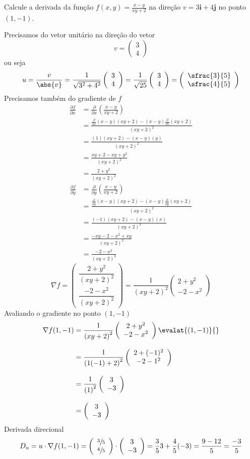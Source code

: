 \documentclass[a4paper,12pt,fleqn]{article}
\newcommand{\D}[2]{\frac{\partial {#1}}{\partial {#2}}}
\newcommand{\vetor}[2]{\left(\begin{array}{c} #1 \\ #2 \end{array}\right)}
\newcommand{\veci}{\bm{i}}
\newcommand{\vecj}{\bm{j}}
\begin{document}
Calcule a derivada da função
\(
  f(x, y) = \frac{x-y}{xy+2}
\)
na direção
\(
  v = 3\veci + 4\vecj
\)
no ponto
\((1, -1)\).

\begin{answer}
  Precisamos do vetor unitário na direção do vetor
  \[
    v = \vetor{3}{4}
  \]
  ou seja
  \[
    u
    = \frac{v}{\abs{v}}
    = \frac{1}{\sqrt{3^2+4^2}}\vetor{3}{4}
    = \frac{1}{\sqrt{25}}\vetor{3}{4}
    = \vetor{\sfrac{3}{5}}{\sfrac{4}{5}}
  \]
  Precisamos também do gradiente de $f$
  \begin{align*}
    \D{f}{x}
    & = \D{}{x}\left(\frac{x-y}{xy+2}\right) \\[3mm]
    & = \frac{\D{}{x}\left(x-y\right)\left(xy+2\right) - \left(x-y\right)\D{}{x}\left(xy+2\right)}
             {\left(xy+2\right)^2} \\[3mm]
    & = \frac{\left(1\right)\left(xy+2\right) - \left(x-y\right)\left(y\right)}
             {\left(xy+2\right)^2} \\[3mm]
    & = \frac{xy+2 - xy + y^2}{\left(xy+2\right)^2} \\[3mm]
    & = \frac{2 + y^2}{\left(xy+2\right)^2}
  \end{align*}
  \begin{align*}
  \D{f}{y}
    & = \D{}{y}\left(\frac{x-y}{xy+2}\right) \\[3mm]
    & = \frac{\D{}{y}\left(x-y\right)\left(xy+2\right) - \left(x-y\right)\D{}{y}\left(xy+2\right)}
    {\left(xy+2\right)^2} \\[3mm]
    & = \frac{\left(-1\right)\left(xy+2\right) - \left(x-y\right)\left(x\right)}
    {\left(xy+2\right)^2} \\[3mm]
    & = \frac{-xy -2 - x^2 + xy}{\left(xy+2\right)^2} \\[3mm]
    & = \frac{-2 - x^2}{\left(xy+2\right)^2}
  \end{align*}
  \[
    \nabla f
    = \left(\begin{array}{r}
      \dfrac{ 2 + y^2}{\left(xy+2\right)^2} \\[5mm]
      \dfrac{-2 - x^2}{\left(xy+2\right)^2}
    \end{array}\right)
    = \frac{1}{\left(xy+2\right)^2}\vetor{ 2 + y^2}{-2 - x^2}
  \]
  Avaliando o gradiente no ponto \((1, -1)\)
  \begin{align*}
    \nabla f(1, -1)
    & = \frac{1}{\left(xy+2\right)^2}\vetor{ 2 + y^2}{-2 - x^2}\evalat{(1, -1)}{} \\[3mm]
    & = \frac{1}{\left(1(-1)+2\right)^2}\vetor{ 2 + (-1)^2}{-2 - 1^2} \\[3mm]
    & = \frac{1}{\left(1\right)^2}\vetor{3}{-3} \\[3mm]
    & = \vetor{3}{-3}
  \end{align*}
  Derivada direcional
  \[
    D_u
    = u \cdot \nabla f(1, -1)
    = \vetor{\sfrac{3}{5}}{\sfrac{4}{5}} \cdot \vetor{3}{-3}
    = \frac{3}{5}3 + \frac{4}{5}(-3)
    = \frac{9-12}{5}
    = \frac{-3}{5}
  \]
  \clearpage
\end{answer}
\end{document}
